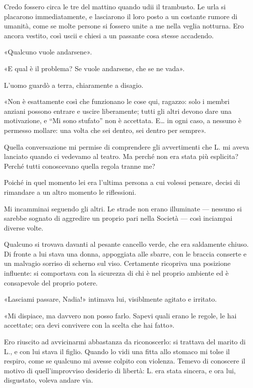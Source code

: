 Credo fossero circa le tre del mattino quando udii il trambusto. Le urla si placarono
immediatamente, e lasciarono il loro posto a un costante rumore di umanità, come se molte persone si
fossero unite a me nella veglia notturna. Ero ancora vestito, così uscii e chiesi a un passante cosa
stesse accadendo.

«Qualcuno vuole andarsene».

«E qual è il problema? Se vuole andarsene, che se ne vada».

L'uomo guardò a terra, chiaramente a disagio.

«Non è esattamente così che funzionano le cose qui, ragazzo: solo i membri anziani possono entrare e
uscire liberamente; tutti gli altri devono dare una motivazione, e ``Mi sono stufato'' non è
accettata. E\dots{} in ogni caso, a nessuno è permesso mollare: una volta che sei dentro, sei dentro
per sempre».

Quella conversazione mi permise di comprendere gli avvertimenti che L. mi aveva lanciato quando ci
vedevamo al teatro. Ma perché non era stata più esplicita? Perché tutti conoscevano quella regola
tranne me?

Poiché in quel momento lei era l'ultima persona a cui volessi pensare, decisi di rimandare a un
altro momento le riflessioni.

Mi incamminai seguendo gli altri. Le strade non erano illuminate --- nessuno si sarebbe sognato di
aggredire un proprio pari nella Società --- così inciampai diverse volte.

Qualcuno si trovava davanti al pesante cancello verde, che era saldamente chiuso. Di fronte a lui
stava una donna, appoggiata alle sbarre, con le braccia conserte e un malvagio sorriso di scherno
sul viso. Certamente ricopriva una posizione influente: si comportava con la sicurezza di chi è nel
proprio ambiente ed è consapevole del proprio potere.

«Lasciami passare, Nadia!» intimava lui, visiblmente agitato e irritato.

«Mi dispiace, ma davvero non posso farlo. Sapevi quali erano le regole, le hai accettate; ora devi
convivere con la scelta che hai fatto».

Ero riuscito ad avvicinarmi abbastanza da riconoscerlo: si trattava del marito di L., e con lui
stava il figlio. Quando lo vidi una fitta allo stomaco mi tolse il respiro, come se qualcuno mi
avesse colpito con violenza. Temevo di conoscere il motivo di quell'improvviso desiderio di libertà:
L. era stata sincera, e ora lui, disgustato, voleva andare via.

